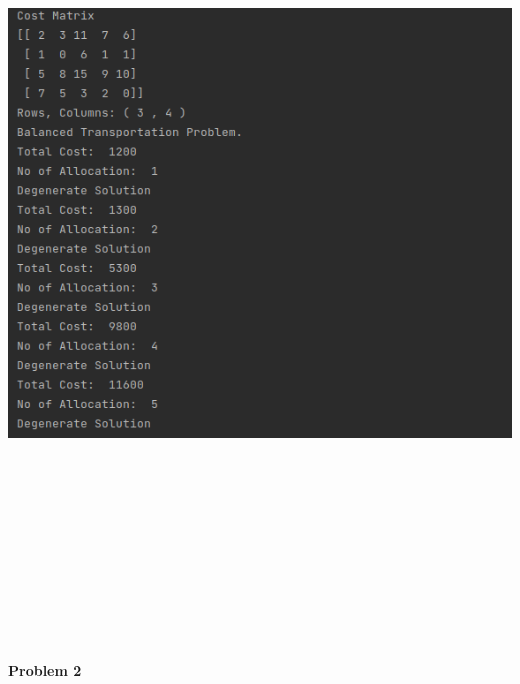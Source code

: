 \documentclass[12pt, letterpaper, twoside]{book}
\begin{document}
\includegraphics[height=600pt,width=550pt]{Output1}

\begin{center}
\textbf{\\Problem 2}
\end{center}
\end{document}
